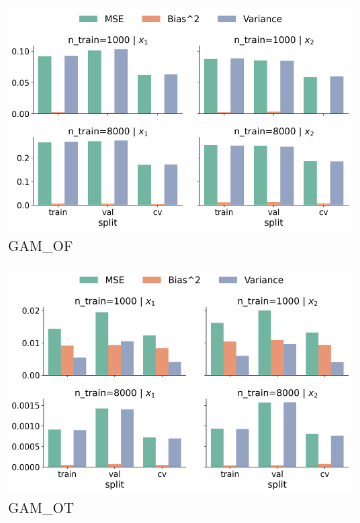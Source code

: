 \documentclass[runningheads]{llncs}
\begin{document}
\begin{figure}[htbp]
    \centering
    \begin{subfigure}[b]{0.49\textwidth}
        \includegraphics[width=\textwidth]{img/SNC/feature_effect_errors_pdp_GAM_OF.png}
        \caption{GAM\_OF}
        \label{fig:pdp-results-snc-gam-of}  %
    \end{subfigure}
    \hfill
    \begin{subfigure}[b]{0.49\textwidth}
        \includegraphics[width=\textwidth]{img/SNC/feature_effect_errors_pdp_GAM_OT.png}
        \caption{GAM\_OT}
        \label{fig:pdp-results-snc-gam-ot}  %
    \end{subfigure}
    \\[10pt]
    \vfill
    \begin{subfigure}[b]{0.49\textwidth}

\end{subfigure}
\end{figure}
\end{document}
